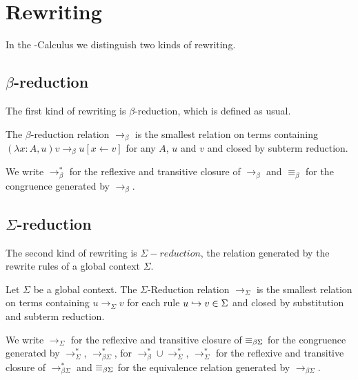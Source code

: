 \section{Rewriting}

In the \lpm-Calculus we distinguish two kinds of rewriting.

\subsection{\texorpdfstring{$\beta$}{}-reduction}

The first kind of rewriting is $\beta$-reduction, which is defined as usual.

\begin{definition} The $\beta$-reduction relation $\longrightarrow_\beta$ is the smallest relation on terms containing
\( (\lambda x:A, u)v \longrightarrow_\beta u[x \leftarrow v] \) for any $A$, $u$ and $v$ and closed by subterm reduction.
\end{definition}

\begin{notation}
We write $\longrightarrow^*_\beta$ for the reflexive and transitive closure of $\longrightarrow_\beta$ and $\equiv_\beta$ for the congruence generated by $\longrightarrow_\beta$.
\end{notation}

\subsection{\texorpdfstring{$\Sigma$}{}-reduction}

The second kind of rewriting is $\Sigma-reduction$, the relation generated by the rewrite rules of a global context $\Sigma$.

\begin{definition}
Let $\Sigma$ be a global context. The  $\Sigma$-Reduction relation $\longrightarrow_\Sigma$ is the smallest relation on terms containing $u \longrightarrow_\Sigma v$
for each rule $u \hookrightarrow v \in \Sigma$ and closed by substitution and subterm reduction.
\end{definition}

\begin{notation}
We write $\longrightarrow_{\Sigma}$ for the reflexive and transitive closure of $\equiv_{\beta\Sigma}$ for the congruence generated by $\longrightarrow^*_{\Sigma}$, $\longrightarrow^*_{\beta\Sigma}$,
for $\longrightarrow^*_{\beta} \cup \longrightarrow^*_{\Sigma}$, $\longrightarrow^*_{\Sigma}$ for the reflexive and transitive closure of $\longrightarrow^*_{\beta\Sigma}$ and $\equiv_{\beta\Sigma}$
for the equivalence relation generated by $\longrightarrow_{\beta\Sigma}$.
\end{notation}

